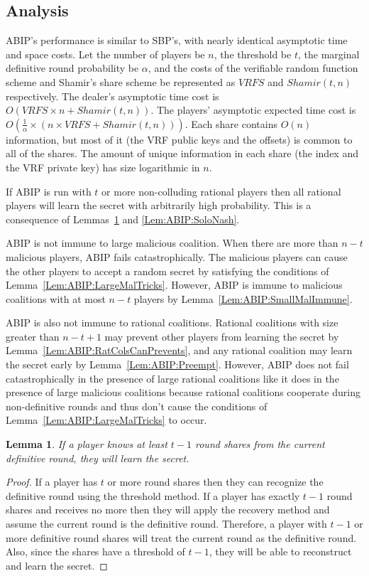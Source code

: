 \documentclass[12pt]{dalcsthesis}
\newtheorem{lemma}{Lemma}
\begin{document}
\subsection{Analysis}

ABIP's performance is similar to SBP's, with nearly identical asymptotic time and space costs. Let the number of players be $n$, the threshold be $t$, the marginal definitive round probability be $\alpha$, and the costs of the verifiable random function scheme and Shamir's share scheme be represented as $VRFS$ and $Shamir(t, n)$ respectively. The dealer's asymptotic time cost is $O(VRFS \times n + Shamir(t, n))$. The players' asymptotic expected time cost is $O(\frac{1}{\alpha} \times (n \times VRFS + Shamir(t, n)))$. Each share contains $O(n)$ information, but most of it (the VRF public keys and the offsets) is common to all of the shares. The amount of unique information in each share (the index and the VRF private key) has size logarithmic in $n$.

If ABIP is run with $t$ or more non-colluding rational players then all rational players will learn the secret with arbitrarily high probability. This is a consequence of Lemmas~\ref{Lem:ABIP:t-1Def_Sufficient} and \ref{Lem:ABIP:SoloNash}.  

ABIP is not immune to large malicious coalition. When there are more than $n-t$ malicious players, ABIP fails catastrophically. The malicious players can cause the other players to accept a random secret by satisfying the conditions of Lemma~\ref{Lem:ABIP:LargeMalTricks}. However, ABIP is immune to malicious coalitions with at most $n-t$ players by Lemma~\ref{Lem:ABIP:SmallMalImmune}.

ABIP is also not immune to rational coalitions. Rational coalitions with size greater than $n-t+1$ may prevent other players from learning the secret by Lemma~\ref{Lem:ABIP:RatColsCanPrevents}, and any rational coalition may learn the secret early by Lemma~\ref{Lem:ABIP:Preempt}. However, ABIP does not fail catastrophically in the presence of large rational coalitions like it does in the presence of large malicious coalitions because rational coalitions cooperate during non-definitive rounds and thus don't cause the conditions of Lemma~\ref{Lem:ABIP:LargeMalTricks} to occur.

\begin{lemma}\label{Lem:ABIP:t-1Def_Sufficient}If a player knows at least $t-1$ round shares from the current definitive round, they will learn the secret.\end{lemma}
\begin{proof}
If a player has $t$ or more round shares then they can recognize the definitive round using the threshold method. If a player has exactly $t-1$ round shares and receives no more then they will apply the recovery method and assume the current round is the definitive round. Therefore, a player with $t-1$ or more definitive round shares will treat the current round as the definitive round. Also, since the shares have a threshold of $t-1$, they will be able to reconstruct and learn the secret.
\end{proof}
\end{document}
